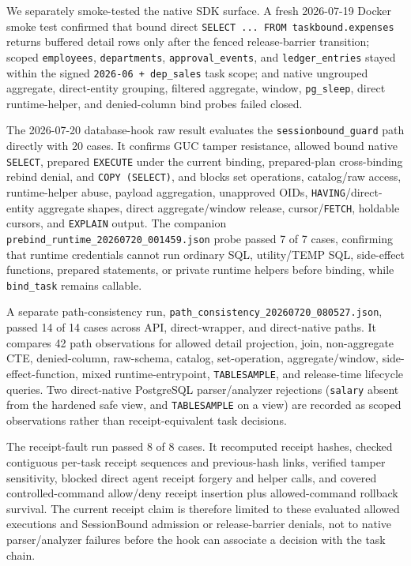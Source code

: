 \documentclass[journal]{IEEEtran}
\begin{document}
We separately smoke-tested the native SDK surface. A fresh 2026-07-19
Docker smoke test confirmed that bound direct
\texttt{SELECT ... FROM taskbound.expenses} returns buffered detail rows
only after the fenced release-barrier transition; scoped
\texttt{employees}, \texttt{departments}, \texttt{approval\_events}, and
\texttt{ledger\_entries} stayed within the signed
\texttt{2026-06 + dep\_sales} task scope; and native ungrouped
aggregate, direct-entity grouping, filtered aggregate, window,
\texttt{pg\_sleep}, direct runtime-helper, and denied-column bind probes
failed closed.

The 2026-07-20 database-hook raw result evaluates the
\texttt{sessionbound\_guard} path directly with 20 cases. It confirms GUC
tamper resistance, allowed bound native \texttt{SELECT}, prepared
\texttt{EXECUTE} under the current binding, prepared-plan cross-binding
rebind denial, and \texttt{COPY (SELECT)}, and blocks set operations,
catalog/raw access, runtime-helper abuse, payload aggregation, unapproved
OIDs, \texttt{HAVING}/direct-entity aggregate shapes, direct aggregate/window
release, cursor/\texttt{FETCH}, holdable cursors, and \texttt{EXPLAIN}
output. The companion
\texttt{prebind\_runtime\_20260720\_001459.json} probe passed 7 of 7
cases, confirming that runtime credentials cannot run ordinary SQL,
utility/TEMP SQL, side-effect functions, prepared statements, or private
runtime helpers before binding, while \texttt{bind\_task} remains callable.

A separate path-consistency run,
\texttt{path\_consistency\_20260720\_080527.json}, passed 14 of 14
cases across API, direct-wrapper, and direct-native paths. It compares
42 path observations for allowed detail projection, join, non-aggregate
CTE, denied-column, raw-schema, catalog, set-operation,
aggregate/window, side-effect-function, mixed runtime-entrypoint,
\texttt{TABLESAMPLE}, and
release-time lifecycle
queries. Two direct-native PostgreSQL parser/analyzer rejections
(\texttt{salary} absent from the hardened safe view, and
\texttt{TABLESAMPLE} on a view) are recorded as scoped observations
rather than receipt-equivalent task decisions.

The receipt-fault run
 passed 8 of 8 cases. It
recomputed receipt hashes, checked contiguous per-task receipt sequences
and previous-hash links, verified tamper sensitivity, blocked direct
agent receipt forgery and helper calls, and covered controlled-command
allow/deny receipt insertion plus allowed-command rollback survival. The current receipt claim is therefore
limited to these evaluated allowed executions and SessionBound admission
or release-barrier denials, not to native parser/analyzer failures before
the hook can associate a decision with the task chain.
\end{document}
